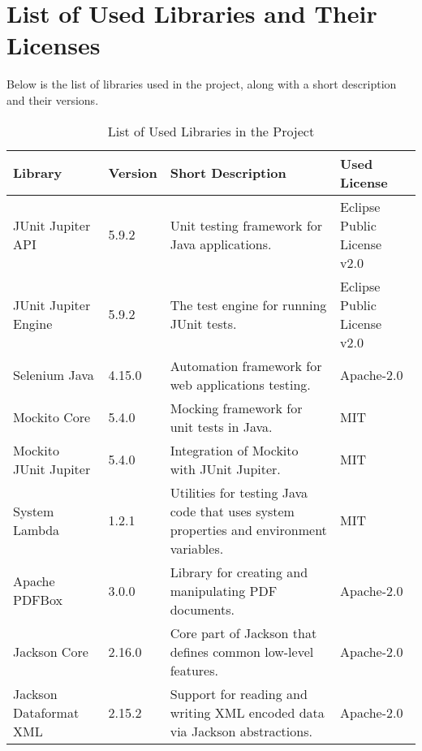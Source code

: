 \section{List of Used Libraries and Their Licenses}
Below is the list of libraries used in the project, along with a short description and their versions.
\begin{table}[ht!]
    \centering
    \setupBfhTabular
    \begin{tabular}{|p{4cm}|p{1cm}|p{5cm}|p{3cm}|} %
        \rowcolor{BFH-tablehead}
        \textbf{Library}       & \textbf{Version} & \textbf{Short Description}                                                             & \textbf{Used License}                            \\
        \hline
        JUnit Jupiter API & 5.9.2 & Unit testing framework for Java applications.
        & Eclipse Public License v2.0 \\
        \hline
        JUnit Jupiter Engine   & 5.9.2            & The test engine for running JUnit tests.
                                                      & Eclipse Public License v2.0 \\
        \hline
        Selenium Java          & 4.15.0           & Automation framework for web applications testing.
                                            & Apache-2.0 \\
        \hline
        Mockito Core           & 5.4.0            & Mocking framework for unit tests in Java.
                                                     & MIT \\
        \hline
        Mockito JUnit Jupiter  & 5.4.0            & Integration of Mockito with JUnit Jupiter.
                                                    & MIT \\
        \hline
        System Lambda          & 1.2.1            & Utilities for testing Java code that uses system properties and environment variables.
        & MIT \\
        \hline
        Apache PDFBox          & 3.0.0            & Library for creating and manipulating PDF documents.
                                          & Apache-2.0 \\
        \hline
        Jackson Core           & 2.16.0           & Core part of Jackson that defines common low-level features.
        & Apache-2.0  \\
        \hline
        Jackson Dataformat XML & 2.15.2           & Support for reading and writing XML encoded data via Jackson abstractions.
        & Apache-2.0 \\
        \hline
    \end{tabular}
    \caption{List of Used Libraries in the Project}
    \label{tab:used-libraries}
\end{table}
